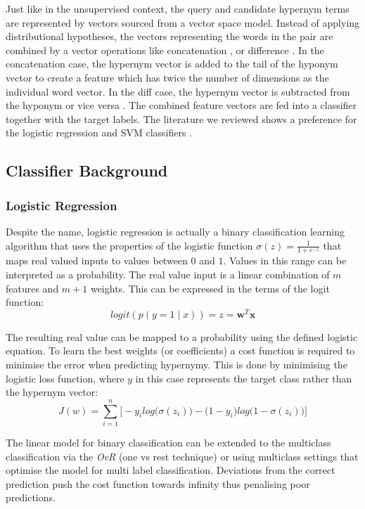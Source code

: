 Just like in the unsupervised context, the query and candidate hypernym terms are represented by vectors sourced from a vector space model.  Instead of applying distributional hypotheses, the vectors representing the words in the pair are combined by a vector operations like concatenation \citep{baroni2012entailment}, or difference \citep{roller2014inclusive}.  In the concatenation case, the hypernym vector is added to the tail of the hyponym vector to create a feature which has twice the number of dimensions as the individual word vector.  In the diff case, the hypernym vector is subtracted from the hyponym \citep{roller2014inclusive} or vice versa \citep{shwartz2017siege}.  The combined feature vectors are fed into a classifier together with the target labels.  The literature we reviewed shows a preference for the logistic regression \citep{roller2014inclusive, shwartz2017siege, levy2015supervised, yamane2016distributional, bernier2018crim} and \ac{SVM} classifiers \citep{shwartz2017siege, levy2015supervised, baroni2012entailment}.

\subsection{Classifier Background}
\subsubsection{Logistic Regression}
Despite the name, logistic regression is actually a binary classification learning algorithm that uses the properties of the logistic function $\sigma(z)=\frac{1}{1 + e^{-z}}$ that maps real valued inputs to values between $0$ and $1$.  Values in this range can be interpreted as a probability. The real value input is a linear combination of $m$ features and $m+1$ weights.  This can be expressed in the terms of the logit function: \[logit(p(y = 1 \mid x)) = z = \textbf{w}^T\textbf{x}\]

The resulting real value can be mapped to a probability using the defined logistic equation.  To learn the best weights (or coefficients) a cost function is required to minimise the error when predicting hypernymy.  This is done by minimising the logistic loss function, where $y$ in this case represents the target class rather than the hypernym vector: 
\[J(w) = \sum_{i=1}^{n}\Big[ -y_i log\big(\sigma(z_i)\big) - \big(1 - y_i \big) log\big(1-\sigma(z_i) \big) \Big] \] 

The linear model for binary classification can be extended to the multiclass classification via the \textit{OvR} (one vs rest technique) or using multiclass settings that optimise the model for multi label classification.  Deviations from the correct prediction push the cost function towards infinity thus penalising poor predictions. 

